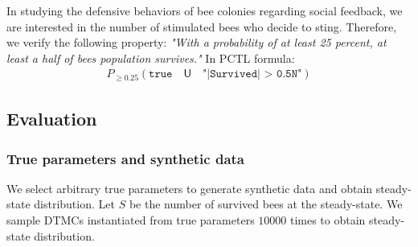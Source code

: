 In studying the defensive behaviors of bee colonies regarding social feedback, we are interested in
the number of stimulated bees who decide to sting. Therefore, we verify the following property:
\textit{"With a probability of at least 25 percent, at least a half of bees population survives."}
In PCTL formula:
\begin{align*}
    P_{\geq 0.25} ( \texttt{true} \quad \mathsf{U} \quad \texttt{"|Survived| > 0.5N"} )
\end{align*}

\subsection{Evaluation}
\subsubsection{True parameters and synthetic data}
We select arbitrary true parameters to generate synthetic data and obtain steady-state distribution.
Let $S$ be the number of survived bees at the steady-state. We sample DTMCs instantiated from true
parameters $10000$ times to obtain steady-state distribution.
